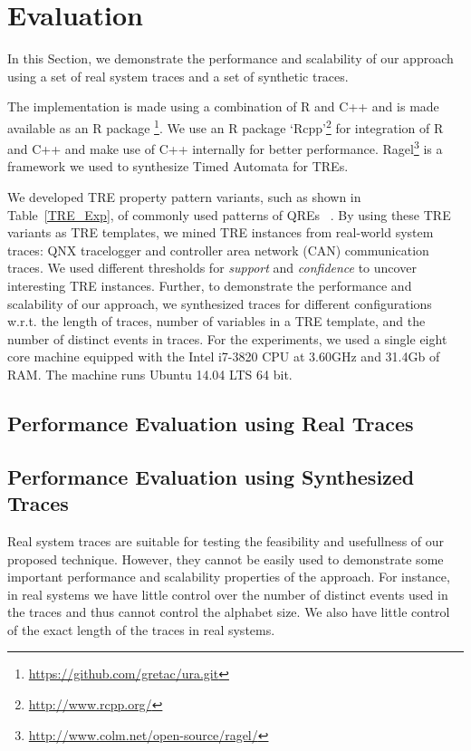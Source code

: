 \documentclass[]{sigplanconf}
\begin{document}
\section{Evaluation}

In this Section, we demonstrate the performance and scalability of our approach using a set of real system traces and a set of synthetic traces.

The implementation is made using a combination of R and C++ and is made available as an R package \footnote{\url{https://github.com/gretac/ura.git}}. We use an R package `Rcpp'\footnote{\url{http://www.rcpp.org/}} for integration of R and C++ and make use of C++ internally for better performance. Ragel\footnote{\url{http://www.colm.net/open-source/ragel/}} is a framework we used to synthesize Timed Automata for TREs.

We developed TRE property pattern variants, such as shown in Table~\ref{TRE_Exp}, of commonly used patterns of QREs ~\cite{DBLP:conf/paste/YangE04}. By using these TRE variants as TRE templates, we mined TRE instances from real-world system traces: QNX tracelogger and controller area network (CAN) communication traces. We used different thresholds for \emph{support} and \emph{confidence} to uncover interesting TRE instances. Further, to demonstrate the performance and scalability of our approach, we synthesized traces for different configurations w.r.t. the length of traces, number of variables in a TRE template, and the number of distinct events in traces. For the experiments, we used a single eight core machine equipped with the Intel i7-3820 CPU at 3.60GHz and 31.4Gb of RAM. The machine runs Ubuntu 14.04 LTS 64 bit.

\subsection{Performance Evaluation using Real Traces}



\subsection{Performance Evaluation using Synthesized Traces}

Real system traces are suitable for testing the feasibility and usefullness of our proposed technique. However, they cannot be easily used to demonstrate some important performance and scalability properties of the approach. For instance, in real systems we have little control over the number of distinct events used in the traces and thus cannot control the alphabet size. We also have little control of the exact length of the traces in real systems.
\end{document}
